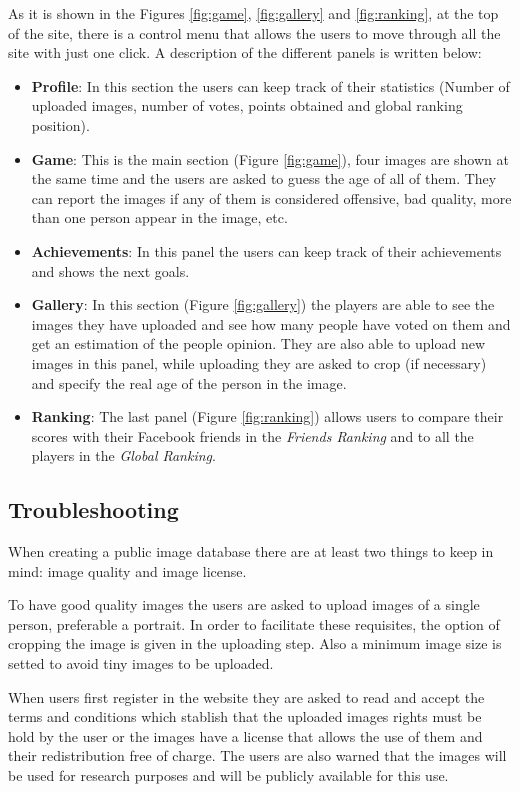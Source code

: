 As it is shown in the Figures \ref{fig:game}, \ref{fig:gallery} and \ref{fig:ranking}, at the top of the site, there is a control menu that allows the users to move through all the site with just one click. A description of the different panels is written below:

\begin{itemize}
	\item \textbf{Profile}: In this section the users can keep track of their statistics (Number of uploaded images, number of votes, points obtained and global ranking position).
	\item \textbf{Game}: This is the main section (Figure \ref{fig:game}), four images are shown at the same time and the users are asked to guess the age of all of them. They can report the images if any of them is considered offensive, bad quality, more than one person appear in the image, etc.
	\item \textbf{Achievements}: In this panel the users can keep track of their achievements and shows the next goals.
	\item \textbf{Gallery}: In this section (Figure \ref{fig:gallery}) the players are able to see the images they have uploaded and see how many people have voted on them and get an estimation of the people opinion. They are also able to upload new images in this panel, while uploading they are asked to crop (if necessary) and specify the real age of the person in the image.
	\item \textbf{Ranking}:	The last panel (Figure \ref{fig:ranking}) allows users to compare their scores with their Facebook friends in the \textit{Friends Ranking} and to all the players in the \textit{Global Ranking}.
\end{itemize}

\subsection{Troubleshooting}\label{sec:trouble}

When creating a public image database there are at least two things to keep in mind: image quality and image license.

To have good quality images the users are asked to upload images of a single person, preferable a portrait. In order to facilitate these requisites, the option of cropping the image is given in the uploading step. Also a minimum image size is setted to avoid tiny images to be uploaded.
 
When users first register in the website they are asked to read and accept the terms and conditions which stablish that the uploaded images rights must be hold by the user or the images have a license that allows the use of them and their redistribution free of charge. The users are also warned that the images will be used for research purposes and will be publicly available for this use. 


